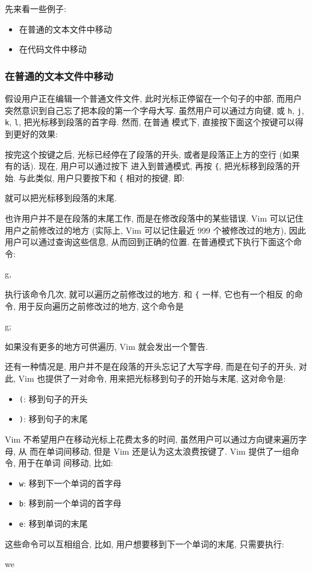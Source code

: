 先来看一些例子:
\begin{itemize}
    \item 在普通的文本文件中移动
    \item 在代码文件中移动
\end{itemize}

\subsubsection{在普通的文本文件中移动}
\label{subsubsec:moving_around_within_a_text_file}

假设用户正在编辑一个普通文件文件, 此时光标正停留在一个句子的中部, 而用户
突然意识到自己忘了把本段的第一个字母大写. 虽然用户可以通过方向键, 或
\texttt{h}, \texttt{j}, \texttt{k}, \texttt{l}, 把光标移到段落的首字母. 然而, 在普通
模式下, 直接按下面这个按键可以得到更好的效果:
\begin{vimcode}
{
\end{vimcode}

按完这个按键之后, 光标已经停在了段落的开头, 或者是段落正上方的空行 (如果
有的话). 现在, 用户可以通过按下  进入到普通模式, 再按 \texttt{\{},
把光标移到段落的开始. 与此类似, 用户只要按下和 \texttt{\{} 相对的按键, 即:
\begin{vimcode}
}
\end{vimcode}
就可以把光标移到段落的末尾.

也许用户并不是在段落的末尾工作, 而是在修改段落中的某些错误. Vim 可以记住
用户之前修改过的地方 (实际上, Vim 可以记住最近 999 个被修改过的地方), 因此
用户可以通过查询这些信息, 从而回到正确的位置. 在普通模式下执行下面这个命令:
\begin{vimcode}
g,
\end{vimcode}
执行该命令几次, 就可以遍历之前修改过的地方. 和 \texttt{\{} 一样, 它也有一个相反
的命令, 用于反向遍历之前修改过的地方, 这个命令是
\begin{vimcode}
g;
\end{vimcode}
如果没有更多的地方可供遍历, Vim 就会发出一个警告.

还有一种情况是, 用户并不是在段落的开头忘记了大写字母, 而是在句子的开头, 对此,
Vim 也提供了一对命令, 用来把光标移到句子的开始与末尾, 这对命令是:
\begin{itemize}
    \item \texttt{(}: 移到句子的开头
    \item \texttt{)}: 移到句子的末尾
\end{itemize}

Vim 不希望用户在移动光标上花费太多的时间, 虽然用户可以通过方向键来遍历字母, 从
而在单词间移动, 但是 Vim 还是认为这太浪费按键了. Vim 提供了一组命令, 用于在单词
间移动, 比如:
\begin{itemize}
    \item \texttt{w}: 移到下一个单词的首字母
    \item \texttt{b}: 移到前一个单词的首字母
    \item \texttt{e}: 移到单词的末尾
\end{itemize}
这些命令可以互相组合, 比如, 用户想要移到下一个单词的末尾, 只需要执行:
\begin{vimcode}
we
\end{vimcode}

